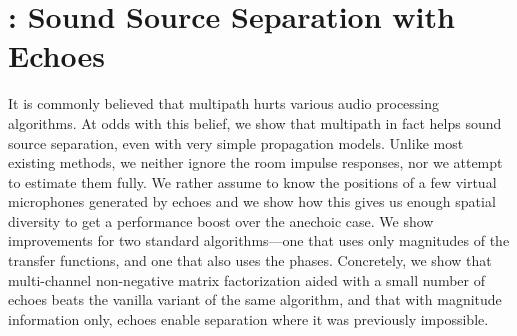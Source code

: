 \chapter{\separake: Sound Source Separation with Echoes}\label{chap:separake}

 It is commonly believed that multipath hurts various audio processing algorithms.
At odds with this belief, we show that multipath in fact helps sound source separation,
even with very simple propagation models. Unlike most existing methods,
we neither ignore the room impulse responses, nor we attempt to estimate them fully.
We rather assume to know the positions of a few virtual microphones generated by
echoes and we show how this gives us enough spatial diversity to get a performance
boost over the anechoic case. We show improvements for two standard algorithms---one that
uses only magnitudes of the transfer functions, and one that also uses the phases.
Concretely, we show that multi-channel non-negative matrix factorization aided with
a small number of echoes beats the vanilla variant of the same algorithm,
and that with magnitude information only, echoes enable separation where it was previously impossible.








